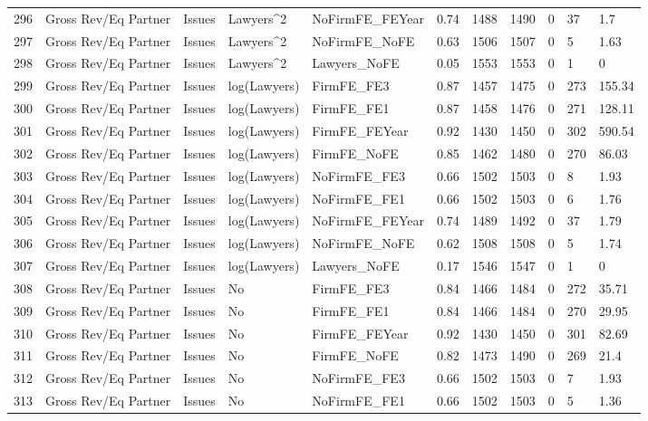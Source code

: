 \begin{table}[ht]
\begin{tabular}{rllllllllll}
  296 & Gross Rev/Eq Partner & Issues & Lawyers^2 & NoFirmFE\_FEYear & 0.74 & 1488 & 1490 & 0 & 37 & 1.7 \\ 
  297 & Gross Rev/Eq Partner & Issues & Lawyers^2 & NoFirmFE\_NoFE & 0.63 & 1506 & 1507 & 0 & 5 & 1.63 \\ 
  298 & Gross Rev/Eq Partner & Issues & Lawyers^2 & Lawyers\_NoFE & 0.05 & 1553 & 1553 & 0 & 1 & 0 \\ 
  299 & Gross Rev/Eq Partner & Issues & log(Lawyers) & FirmFE\_FE3 & 0.87 & 1457 & 1475 & 0 & 273 & 155.34 \\ 
  300 & Gross Rev/Eq Partner & Issues & log(Lawyers) & FirmFE\_FE1 & 0.87 & 1458 & 1476 & 0 & 271 & 128.11 \\ 
  301 & Gross Rev/Eq Partner & Issues & log(Lawyers) & FirmFE\_FEYear & 0.92 & 1430 & 1450 & 0 & 302 & 590.54 \\ 
  302 & Gross Rev/Eq Partner & Issues & log(Lawyers) & FirmFE\_NoFE & 0.85 & 1462 & 1480 & 0 & 270 & 86.03 \\ 
  303 & Gross Rev/Eq Partner & Issues & log(Lawyers) & NoFirmFE\_FE3 & 0.66 & 1502 & 1503 & 0 & 8 & 1.93 \\ 
  304 & Gross Rev/Eq Partner & Issues & log(Lawyers) & NoFirmFE\_FE1 & 0.66 & 1502 & 1503 & 0 & 6 & 1.76 \\ 
  305 & Gross Rev/Eq Partner & Issues & log(Lawyers) & NoFirmFE\_FEYear & 0.74 & 1489 & 1492 & 0 & 37 & 1.79 \\ 
  306 & Gross Rev/Eq Partner & Issues & log(Lawyers) & NoFirmFE\_NoFE & 0.62 & 1508 & 1508 & 0 & 5 & 1.74 \\ 
  307 & Gross Rev/Eq Partner & Issues & log(Lawyers) & Lawyers\_NoFE & 0.17 & 1546 & 1547 & 0 & 1 & 0 \\ 
  308 & Gross Rev/Eq Partner & Issues & No & FirmFE\_FE3 & 0.84 & 1466 & 1484 & 0 & 272 & 35.71 \\ 
  309 & Gross Rev/Eq Partner & Issues & No & FirmFE\_FE1 & 0.84 & 1466 & 1484 & 0 & 270 & 29.95 \\ 
  310 & Gross Rev/Eq Partner & Issues & No & FirmFE\_FEYear & 0.92 & 1430 & 1450 & 0 & 301 & 82.69 \\ 
  311 & Gross Rev/Eq Partner & Issues & No & FirmFE\_NoFE & 0.82 & 1473 & 1490 & 0 & 269 & 21.4 \\ 
  312 & Gross Rev/Eq Partner & Issues & No & NoFirmFE\_FE3 & 0.66 & 1502 & 1503 & 0 & 7 & 1.93 \\ 
  313 & Gross Rev/Eq Partner & Issues & No & NoFirmFE\_FE1 & 0.66 & 1502 & 1503 & 0 & 5 & 1.36 \\ 

\end{tabular}
\end{table}
